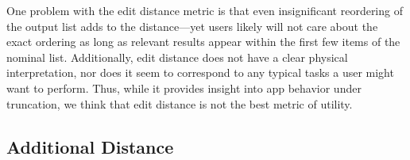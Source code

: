 \documentclass[10pt, conference, compsocconf]{IEEEtran}
\newcommand{\comment}[3][\color{red}]{{#1{[{#2}: {#3}]}}}
\newcommand{\kris}[1]{\comment[\color{orange}]{km}{#1}}
\newcommand{\jeff}[1]{\comment[\color{green}]{JSF}{#1}}
\begin{document}
{%
One problem with the edit distance metric is that even insignificant
reordering of the output list adds to the distance---yet users likely
will not care about the exact ordering as long as relevant results
appear within the first few items of the nominal list. Additionally,
edit distance does not have a clear physical interpretation, nor does
it seem to correspond to any typical tasks a user might want to
perform. Thus, while it provides insight into app behavior under
truncation, we think that edit distance is not the best metric of
utility.




\subsection{Additional Distance}

\begin{figure}
  \centering

  \begin{subfigure}{\textwidth}
  \begin{tabular}{ccc}
    

\end{tabular}
\end{subfigure}
\end{figure}}
\end{document}
